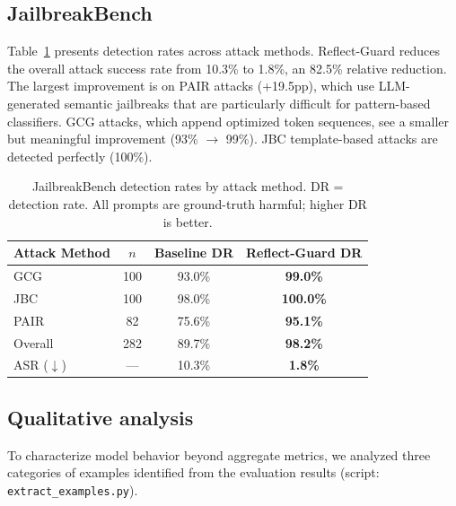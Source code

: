 \documentclass[11pt]{article}
\begin{document}
\subsection{JailbreakBench}

Table~\ref{tab:jailbreakbench} presents detection rates across attack methods. Reflect-Guard reduces the overall attack success rate from 10.3\% to 1.8\%, an 82.5\% relative reduction. The largest improvement is on PAIR attacks (+19.5pp), which use LLM-generated semantic jailbreaks that are particularly difficult for pattern-based classifiers. GCG attacks, which append optimized token sequences, see a smaller but meaningful improvement (93\% $\to$ 99\%). JBC template-based attacks are detected perfectly (100\%).

\begin{table}[t]
  \caption{JailbreakBench detection rates by attack method. DR = detection rate. All prompts are ground-truth harmful; higher DR is better.}
  \label{tab:jailbreakbench}
  \centering
  \begin{tabular}{lccc}
    \toprule
    Attack Method & $n$ & Baseline DR & Reflect-Guard DR \\
    \midrule
    GCG & 100 & 93.0\% & \textbf{99.0\%} \\
    JBC & 100 & 98.0\% & \textbf{100.0\%} \\
    PAIR & 82 & 75.6\% & \textbf{95.1\%} \\
    \midrule
    Overall & 282 & 89.7\% & \textbf{98.2\%} \\
    \midrule
    ASR ($\downarrow$) & --- & 10.3\% & \textbf{1.8\%} \\
    \bottomrule
  \end{tabular}
\end{table}

\subsection{Qualitative analysis}
\label{sec:qualitative}

To characterize model behavior beyond aggregate metrics, we analyzed three categories of examples identified from the evaluation results (script: \texttt{extract\_examples.py}).
\end{document}
